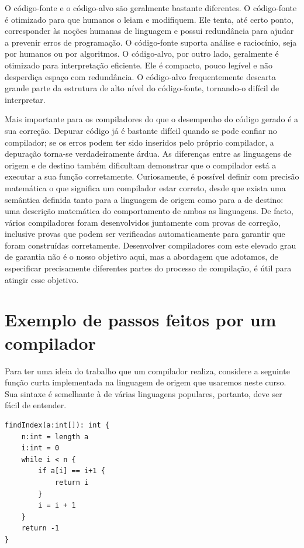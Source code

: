 O código-fonte e o código-alvo são geralmente bastante diferentes. O
código-fonte é otimizado para que humanos o leiam e modifiquem. Ele
tenta, até certo ponto, corresponder às noções humanas de linguagem e
possui redundância para ajudar a prevenir erros de programação. O
código-fonte suporta análise e raciocínio, seja por humanos ou por
algoritmos. O código-alvo, por outro lado, geralmente é otimizado
para interpretação eficiente. Ele é compacto, pouco legível e não
desperdiça espaço com redundância. O código-alvo frequentemente
descarta grande parte da estrutura de alto nível do código-fonte,
tornando-o difícil de interpretar.

Mais importante para os compiladores do que o desempenho do código
gerado é a sua correção. Depurar código já é bastante difícil quando
se pode confiar no compilador; se os erros podem ter sido inseridos
pelo próprio compilador, a depuração torna-se verdadeiramente árdua.
As diferenças entre as linguagens de origem e de destino também
dificultam demonstrar que o compilador está a executar a sua função
corretamente. Curiosamente, é possível definir com precisão
matemática o que significa um compilador estar correto, desde que
exista uma semântica definida tanto para a linguagem de origem como
para a de destino: uma descrição matemática do comportamento de ambas
as linguagens. De facto, vários compiladores foram desenvolvidos
juntamente com provas de correção, inclusive provas que podem ser
verificadas automaticamente para garantir que foram construídas
corretamente. Desenvolver compiladores com este elevado grau de
garantia não é o nosso objetivo aqui, mas a abordagem que adotamos,
de especificar precisamente diferentes partes do processo de
compilação, é útil para atingir esse objetivo.

\section{Exemplo de passos feitos por um compilador}

Para ter uma ideia do trabalho que um compilador realiza, considere a
seguinte função curta implementada na linguagem de origem que
usaremos neste curso. Sua sintaxe é semelhante à de várias linguagens
populares, portanto, deve ser fácil de entender.

\begin{verbatim}
findIndex(a:int[]): int {
    n:int = length a
    i:int = 0
    while i < n {
        if a[i] == i+1 {
            return i
        }
        i = i + 1
    }
    return -1
}
\end{verbatim}


